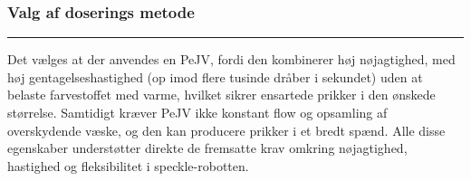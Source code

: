 \subsubsection{Valg af doserings metode}  \plainbreak{-.5}
Det vælges at der anvendes en PeJV, fordi den kombinerer høj nøjagtighed, med høj gentagelseshastighed (op imod flere tusinde dråber i sekundet) uden at belaste farvestoffet med varme, hvilket sikrer ensartede prikker i den ønskede størrelse. Samtidigt kræver PeJV ikke konstant flow og opsamling af overskydende væske, og den kan producere prikker i et bredt spænd. Alle disse egenskaber understøtter direkte de fremsatte krav omkring nøjagtighed, hastighed og fleksibilitet i speckle-robotten. 
